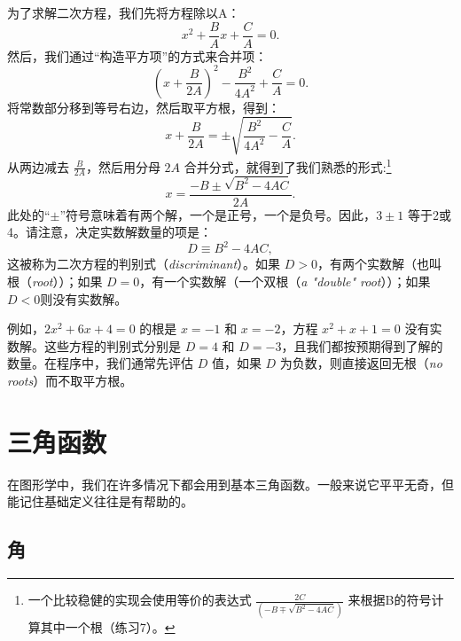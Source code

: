 
为了求解二次方程，我们先将方程除以A：
\[
  x^2+\frac{B}{A} x+\frac{C}{A}=0.
\]
然后，我们通过“构造平方项”的方式来合并项：
\[
  \left(x+\frac{B}{2 A}\right)^{2}-\frac{B^{2}}{4 A^{2}}+\frac{C}{A}=0.
\]
将常数部分移到等号右边，然后取平方根，得到：
\[
  x+\frac{B}{2 A}=\pm \sqrt{\frac{B^{2}}{4 A^{2}}-\frac{C}{A}}.
\]
从两边减去 $\frac{B}{2 A}$，然后用分母 $2A$ 合并分式，就得到了我们熟悉的形式:\footnote[1]{一个比较稳健的实现会使用等价的表达式 $\frac{2C}{\left(-B \mp \sqrt{B^{2}-4 A C}\right)}$ 来根据B的符号计算其中一个根（练习7）。}
\begin{equation}
  x=\frac{-B \pm \sqrt{B^{2}-4AC}}{2A}.
\end{equation}
此处的“$\pm$”符号意味着有两个解，一个是正号，一个是负号。因此，$3\pm1$ 等于2或4。请注意，决定实数解数量的项是：
\[
  D \equiv B^{2}-4AC,
\]
这被称为二次方程的判别式（\textit{discriminant}）。如果 $D>0$，有两个实数解（也叫根（\textit{root}））；如果 $D=0$，有一个实数解（一个双根（\textit{a "double" root}））；如果 $D<0$则没有实数解。

例如，$2x^2+6x+4=0$ 的根是 $x=-1$ 和 $x=-2$，方程 $x^2+x+1=0$ 没有实数解。这些方程的判别式分别是 $D=4$ 和 $D=-3$，且我们都按预期得到了解的数量。在程序中，我们通常先评估 $D$ 值，如果 $D$ 为负数，则直接返回无根（\textit{no roots}）而不取平方根。

\section{三角函数}

在图形学中，我们在许多情况下都会用到基本三角函数。一般来说它平平无奇，但能记住基础定义往往是有帮助的。

\subsection{角}


